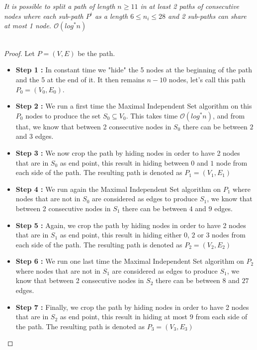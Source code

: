 \begin{claim}\label{claim:path} 
\textit{It is possible to split a path of length $n\geq 11$ in at least 2 paths of consecutive nodes where each sub-path $P^i$ as a length $6\leq n_i \leq 28$ and 2 sub-paths can share at most 1 node. $\mathcal{O}(log^*n)$}\\\\
\begin{proof}
Let $P=(V,E)$ be the path.
\begin{itemize}
\item\textbf{Step 1 :} In constant time we "hide" the 5 nodes at the beginning of the path and the 5 at the end of it.
It then remains $n-10$ nodes, let's call this path $P_0=(V_0,E_0)$.\\
\item\textbf{Step 2 :} We run a first time the Maximal Independent Set algorithm on this $P_0$ nodes to produce the set $S_0\subseteq V_0$. This takes time $\mathcal{O}(log^*n)$, and from that, we know that between 2 consecutive nodes in $S_0$ there can be between $2$ and $3$ edges.\\
\item\textbf{Step 3 :} We now crop the path by hiding nodes in order to have 2 nodes that are in $S_0$ as end point, this result in hiding between $0$ and $1$ node from each side of the path. The resulting path is denoted as $P_1=(V_1,E_1)$\\
\item\textbf{Step 4 :} We run again the Maximal Independent Set algorithm on $P_1$ where nodes that are not in $S_0$ are considered as edges to produce $S_1$, we know that between 2 consecutive nodes in $S_1$ there can be between $4$ and $9$ edges.\\
\item\textbf{Step 5 :} Again, we crop the path by hiding nodes in order to have 2 nodes that are in $S_1$ as end point, this result in hiding either $0$, $2$ or $3$ nodes from each side of the path. The resulting path is denoted as $P_2=(V_2,E_2)$\\
\item\textbf{Step 6 :} We run one last time the Maximal Independent Set algorithm on $P_2$ where nodes that are not in $S_1$ are considered as edges to produce $S_1$, we know that between 2 consecutive nodes in $S_2$ there can be between $8$ and $27$ edges.\\
\item\textbf{Step 7 :} Finally, we crop the path by hiding nodes in order to have 2 nodes that are in $S_2$ as end point, this result in hiding at most $9$ from each side of the path. The resulting path is denoted as $P_3=(V_3,E_3)$\\

\end{itemize}
\end{proof}
\end{claim}
